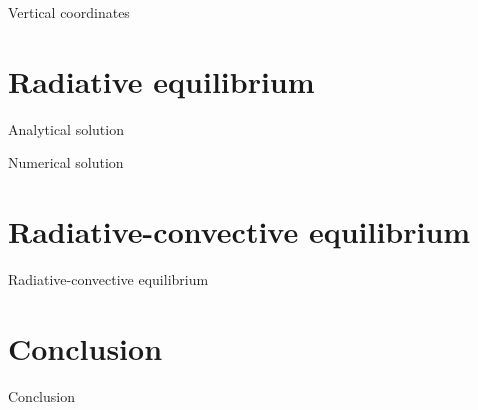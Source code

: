 \documentclass[aspectratio=43]{beamer}
\begin{document}
\begin{frame}{Vertical coordinates}
\end{frame}



\section{Radiative equilibrium}
\begin{frame}{Analytical solution}
\end{frame}

\begin{frame}{Numerical solution}
\end{frame}



\section{Radiative-convective equilibrium}
\begin{frame}{Radiative-convective equilibrium}
\end{frame}



\section{Conclusion}
\begin{frame}{Conclusion}
\end{frame}
\end{document}
